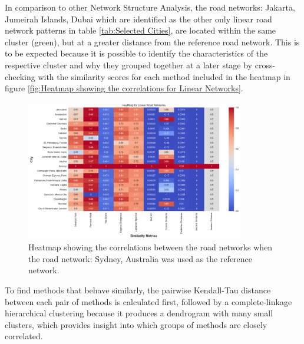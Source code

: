 In comparison to other Network Structure Analysis, the road networks: Jakarta, Jumeirah Islands, Dubai which are identified as the other only linear road network patterns in table \ref{tab:Selected Cities}, are located within the same cluster (green), but at a greater distance from the reference road network. This is to be expected because it is possible to identify the characteristics of the respective cluster and why they grouped together at a later stage by cross-checking with the similarity scores for each method included in the heatmap in figure \ref{fig:Heatmap showing the correlations for Linear Networks}.


\begin{figure}[!ht]
\centering
\includegraphics[width=0.85\textwidth,center]{picture/Linear/linearheatmap.png}
\caption[Heatmap showing the correlations for Linear Road Networks]{Heatmap showing the correlations between the road networks when the road network: Sydney, Australia was used as the reference network.}
\label{fig:Heatmap showing the correlations for Linear Road Networks}
\end{figure}

To find methods that behave similarly, the pairwise Kendall-Tau distance between each pair of methods is calculated first, followed by a complete-linkage hierarchical clustering because it produces a dendrogram with many small clusters, which provides insight into which groups of methods are closely correlated.

